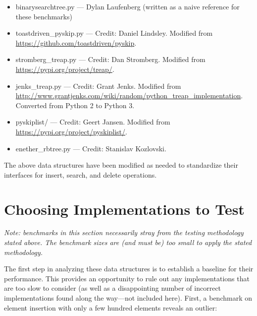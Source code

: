 \documentclass{article}
\begin{document}
\begin{itemize}
    \item binarysearchtree.py --- Dylan Laufenberg (written as a naive reference for these benchmarks)
    \item toastdriven\_pyskip.py --- Credit: Daniel Lindsley. Modified from \url{https://github.com/toastdriven/pyskip}.
    \item stromberg\_treap.py --- Credit: Dan Stromberg. Modified from \url{https://pypi.org/project/treap/}.
    \item jenks\_treap.py --- Credit: Grant Jenks. Modified from \url{http://www.grantjenks.com/wiki/random/python_treap_implementation}. Converted from Python 2 to Python 3.
    \item pyskiplist/ --- Credit: Geert Jansen. Modified from \url{https://pypi.org/project/pyskiplist/}.
    \item enether\_rbtree.py --- Credit: Stanislav Kozlovski. 
\end{itemize}

The above data structures have been modified as needed to standardize their interfaces for insert, search, and delete operations.

\section{Choosing Implementations to Test}

\emph{Note: benchmarks in this section necessarily stray from the testing methodology stated above. The benchmark sizes are (and must be) too small to apply the stated methodology.}

The first step in analyzing these data structures is to establish a baseline for their performance. This provides an opportunity to rule out any implementations that are too slow to consider (as well as a disappointing number of incorrect implementations found along the way---not included here). First, a benchmark on element insertion with only a few hundred elements reveals an outlier:
\end{document}
